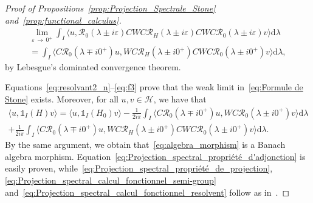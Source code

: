 \documentclass[AHL,Unicode,longabstracts,published]{cedram}
\newcommand{\Hi}{\mathcal{H}}
\newcommand{\rmd}{\mathrm{d}}
\newcommand{\Res}{\mathcal{R}}
\newcommand{\Hi}{\mathcal{H}}
\begin{document}
\begin{proof}[Proof of Propositions~\ref{prop:Projection_Spectrale_Stone} and~\ref{prop:functional_calculus}]
\begin{multline}\label{eq:f3}
\lim_{\varepsilon\,\rightarrow\,0^+} \int_I \Big \langle u, \Res_0(\lambda\pm i\varepsilon)CWC\Res_H(\lambda\pm i\varepsilon)CWC\Res_0(\lambda\pm i\varepsilon) v \Big \rangle \rmd \lambda\\
= \int_I \Big \langle C \Res_0(\lambda\mp i0^+) u, WC\Res_H(\lambda\pm i0^+)CWC\Res_0(\lambda\pm i0^+) v \Big \rangle \rmd \lambda, 
\end{multline}
by Lebesgue's dominated convergence theorem.

Equations~\eqref{eq:resolvant2_n}--\eqref{eq:f3} prove that the weak limit in~\eqref{eq:Formule de Stone} exists. Moreover, for all $u,v\in\Hi$, we have that
\begin{multline*}
\langle u, \mathds{1}_I(H) v\rangle = \langle u, \mathds{1}_I(H_0) v\rangle - \frac{1}{2i\pi} \int_I \big \langle C \Res_{0}\left(\lambda\mp i0^+\right) u, WC\Res_{0}\left(\lambda\pm i0^+\right) v \big \rangle \rmd \lambda \\
+ \frac{1}{2i\pi} \int_I \Big \langle C \Res_0\left(\lambda\mp i0^+\right) u, WC\Res_H\left(\lambda\pm i0^+\right)CWC\Res_0\left(\lambda\pm i0^+\right) v \Big \rangle \rmd \lambda.
\end{multline*}
By the same argument, we obtain that~\eqref{eq:algebra_morphism} is a Banach algebra morphism. Equation~\eqref{eq:Projection_spectral_propriété_d'adjonction} is easily proven, while~\eqref{eq:Projection_spectral_propriété_de_projection}, \eqref{eq:Projection_spectral_calcul_fonctionnel_semi-group} and~\eqref{eq:Projection_spectral_calcul_fonctionnel_resolvent} follow as in~\cite{FaFr18_01}.
\end{proof}
\end{document}
